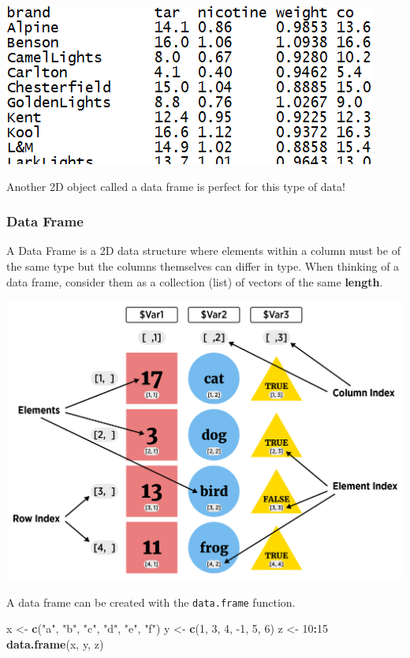 \documentclass[
]{book}
\newenvironment{Shaded}{\begin{snugshade}}{\end{snugshade}}
\newcommand{\DecValTok}[1]{\textcolor[rgb]{0.00,0.00,0.81}{#1}}
\newcommand{\KeywordTok}[1]{\textcolor[rgb]{0.13,0.29,0.53}{\textbf{#1}}}
\newcommand{\NormalTok}[1]{#1}
\newcommand{\OperatorTok}[1]{\textcolor[rgb]{0.81,0.36,0.00}{\textbf{#1}}}
\newcommand{\StringTok}[1]{\textcolor[rgb]{0.31,0.60,0.02}{#1}}
\theoremstyle{definition}
\theoremstyle{definition}
\theoremstyle{definition}
\theoremstyle{remark}
\begin{document}
\begin{center}\includegraphics[width=0.8\linewidth]{img/dataset} \end{center}

Another 2D object called a data frame is perfect for this type of data!

\hypertarget{data-frame}{%
\subsubsection{Data Frame}\label{data-frame}}

A Data Frame is a 2D data structure where elements within a column must be of the same type but the columns themselves can differ in type. When thinking of a data frame, consider them as a collection (list) of vectors of the same \textbf{length}.

\begin{center}\includegraphics[width=0.8\linewidth]{img/dfVisualF} \end{center}

A data frame can be created with the \texttt{data.frame} function.

\begin{Shaded}
\begin{Highlighting}[]
\NormalTok{x <-}\StringTok{ }\KeywordTok{c}\NormalTok{(}\StringTok{"a"}\NormalTok{, }\StringTok{"b"}\NormalTok{, }\StringTok{"c"}\NormalTok{, }\StringTok{"d"}\NormalTok{, }\StringTok{"e"}\NormalTok{, }\StringTok{"f"}\NormalTok{)}
\NormalTok{y <-}\StringTok{ }\KeywordTok{c}\NormalTok{(}\DecValTok{1}\NormalTok{, }\DecValTok{3}\NormalTok{, }\DecValTok{4}\NormalTok{, }\DecValTok{-1}\NormalTok{, }\DecValTok{5}\NormalTok{, }\DecValTok{6}\NormalTok{)}
\NormalTok{z <-}\StringTok{ }\DecValTok{10}\OperatorTok{:}\DecValTok{15}
\KeywordTok{data.frame}\NormalTok{(x, y, z)}
\end{Highlighting}
\end{Shaded}
\end{document}
